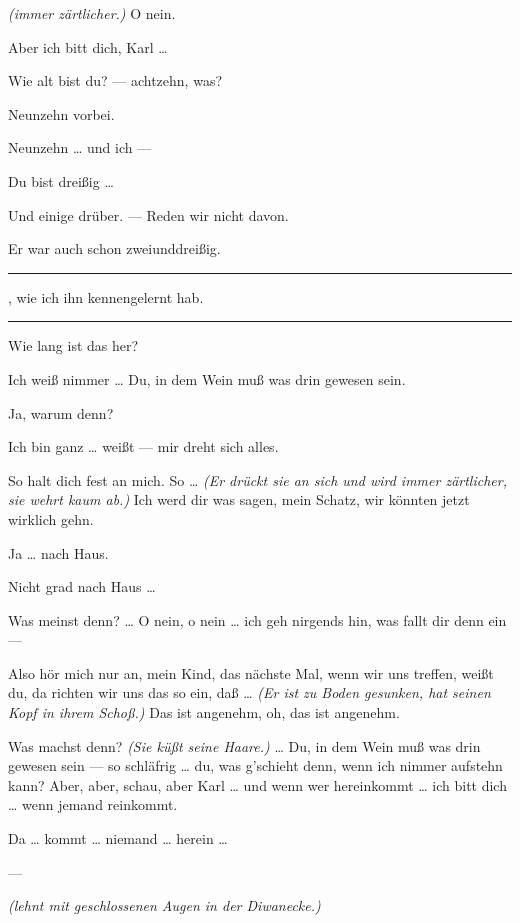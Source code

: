 \documentclass[
	final,
	a4paper,
	ngerman,
	mpinclude = true, %
	twoside = true,
	open = right,
	cleardoublepage = plain,
	DIV = 13,
	BCOR = 1cm,
	titlepage = firstiscover,
	]{scrbook}
\newcommand{\direction}[1]{\textit{(#1)}}
\newcommand{\hiat}{---}
\newenvironment{deletion}{%
		\vspace{0.25\baselineskip}
		\hrule
		\vspace{0.25\baselineskip}
		\color{darkgray}
	}{
		\color{black}
		\vspace{0.25\baselineskip}
		\hrule 
		\vspace{0.25\baselineskip}
	}
\newcommand{\thecharacter}[1]{\textup{\textsc{#1}}}
\newcommand{\thegatte}{\thecharacter{Gatte}}
\newcommand{\thesuesse}{\thecharacter{Süßes Mädel}}
\newcommand{\character}[1]{\item[#1:]}
\newcommand{\gatte}{\character{\thegatte}}
\newcommand{\suesse}{\character{\thesuesse}}
\begin{document}
\begin{play}
	\gatte
	\direction{immer zärtlicher.} O nein.

	\suesse
	Aber ich bitt dich, Karl \ldots{}

	\gatte
	Wie alt bist du? --- achtzehn, was?

	\suesse
	Neunzehn vorbei.

	\gatte
	Neunzehn \ldots{} und ich ---

	\suesse
	Du bist dreißig \ldots{}

	\gatte
	Und einige drüber. --- Reden wir nicht davon.

	\suesse
	Er war auch schon zweiunddreißig.
	\begin{deletion}
	, wie ich ihn kennengelernt hab.
	\end{deletion}

	\gatte
	Wie lang ist das her?

	\suesse
	Ich weiß nimmer \ldots{} Du, in dem Wein muß was drin gewesen sein.

	\gatte
	Ja, warum denn?

	\suesse
	Ich bin ganz \ldots{} weißt --- mir dreht sich alles.

	\gatte
	So halt dich fest an mich. So \ldots{} \direction{Er drückt sie an sich und wird immer zärtlicher, sie wehrt kaum ab.} Ich werd dir was sagen, mein Schatz, wir könnten jetzt wirklich gehn.

	\suesse
	Ja \ldots{} nach Haus.

	\gatte
	Nicht grad nach Haus \ldots{}

	\suesse
	Was meinst denn? \ldots{} O nein, o nein \ldots{} ich geh nirgends hin, was fallt dir denn ein ---

	\gatte
	Also hör mich nur an, mein Kind, das nächste Mal, wenn wir uns treffen, weißt du, da richten wir uns das so ein, daß \ldots{} \direction{Er ist zu Boden gesunken, hat seinen Kopf in ihrem Schoß.} Das ist angenehm, oh, das ist angenehm.

	\suesse
	Was machst denn? \direction{Sie küßt seine Haare.} \ldots{} Du, in dem Wein muß was drin gewesen sein --- so schläfrig \ldots{} du, was g'schieht denn, wenn ich nimmer aufstehn kann? Aber, aber, schau, aber Karl \ldots{} und wenn wer hereinkommt \ldots{} ich bitt dich \ldots{} wenn jemand reinkommt.

	\gatte
	Da \ldots{} kommt \ldots{} niemand \ldots{} herein \ldots{}

	\hiat

	\suesse
	\direction{lehnt mit geschlossenen Augen in der Diwanecke.}


\end{play}
\end{document}
